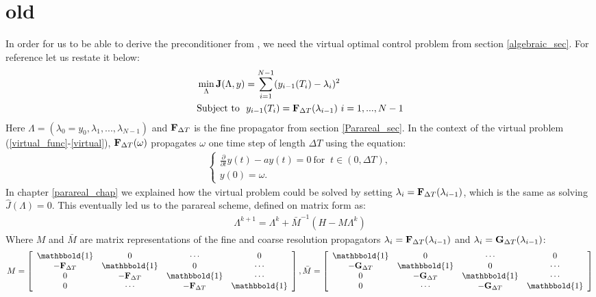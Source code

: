 \documentclass[11pt,a4paper]{article}
\begin{document}
\section{old}
In order for us to be able to derive the preconditioner from \cite{maday2002parareal}, we need the virtual optimal control problem from section \ref{algebraic_sec}. For reference let us restate it below:
\begin{align}
&\min_{\Lambda}\bold{J}(\Lambda,y) = \sum_{i=1}^{N-1} (y_{i-1}(T_{i})-\lambda_{i})^2 \label{virtual_func} \\
&\textrm{Subject to } \ y_{i-1}(T_{i}) = \bold F_{\Delta T}(\lambda_{i-1}) \ i=1,...,N-1 \label{virtual}
\end{align}
Here $\Lambda=(\lambda_0=y_0,\lambda_1,...,\lambda_ {N-1})$ and $\bold F_{\Delta T}$ is the fine propagator from section \ref{Parareal_sec}. In the context of the virtual problem (\ref{virtual_func}-\ref{virtual}), $\bold F_{\Delta T}(\omega)$ propagates $\omega$ one time step of length $\Delta T$ using the equation:
\begin{align}
\left\{
     \begin{array}{lr}
       	\frac{\partial}{\partial t} y(t)-ay(t)=0  \ \textrm{for } \ t\in(0,\Delta T),\\
       	y(0)=\omega.
     \end{array}
   \right. \label{virtual_exs}
\end{align} 
In chapter \ref{parareal_chap} we explained how the virtual problem could be solved by setting $\lambda_i= \bold F_{\Delta T}(\lambda_{i-1})$, which is the same as solving $\hat{J}(\Lambda)=0$. This eventually led us to the parareal scheme, defined on matrix form as:
\begin{align}
\Lambda^{k+1} = \Lambda^k + \bar{M}^{-1}(H-M\Lambda^k)\label{par_mat_sys}
\end{align}
Where $M$ and $\bar{M}$ are matrix representations of the fine and coarse resolution propagators $\lambda_i= \bold F_{\Delta T}(\lambda_{i-1})$ and  $\lambda_i= \bold G_{\Delta T}(\lambda_{i-1})$:
\begin{align*}
M = \left[ \begin{array}{cccc}
   \mathbbold{1} & 0 & \cdots & 0 \\  
   -\bold{F}_{\Delta T} & \mathbbold{1} & 0 & \cdots \\ 
   0 &-\bold{F}_{\Delta T} & \mathbbold{1}  & \cdots \\
   0 &\cdots &-\bold{F}_{\Delta T} & \mathbbold{1}  \\
   \end{array}  \right],
\bar{M} = \left[ \begin{array}{cccc}
   \mathbbold{1} & 0 & \cdots & 0 \\  
   -\bold{G}_{\Delta T} & \mathbbold{1} & 0 & \cdots \\ 
   0 &-\bold{G}_{\Delta T} & \mathbbold{1}  & \cdots \\
   0 &\cdots &-\bold{G}_{\Delta T} & \mathbbold{1}   \\
   \end{array}  \right]
\end{align*}
\end{document}
